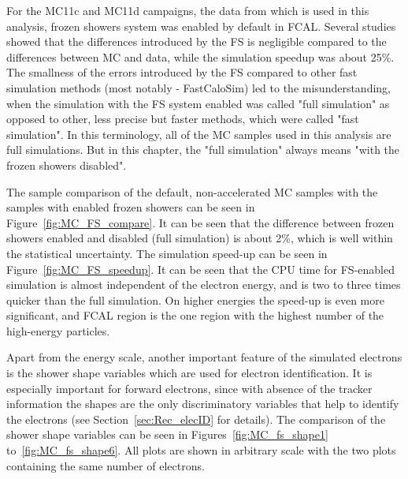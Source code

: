 For the MC11c and MC11d campaigns, the data from which is used in this analysis, frozen showers system was enabled by default in FCAL. Several studies showed that the differences introduced by the FS is negligible compared to the differences between MC and data, while the simulation speedup was about 25\%. The smallness of the errors introduced by the FS compared to other fast simulation methods (most notably - FastCaloSim) led to the misunderstanding, when the simulation with the FS system enabled was called "full simulation" as opposed to other, less precise but faster methods, which were called "fast simulation". In this terminology, all of the MC samples used in this analysis are full simulations. But in this chapter, the "full simulation" always means "with the frozen showers disabled".

The sample comparison of the default, non-accelerated MC samples with the samples with enabled frozen showers can be seen in Figure~\ref{fig:MC_FS_compare}. It can be seen that the difference between frozen showers enabled and disabled (full simulation) is about 2\%, which is well within the statistical uncertainty. The simulation speed-up can be seen in Figure~\ref{fig:MC_FS_speedup}. It can be seen that the CPU time for FS-enabled simulation is almost independent of the electron energy, and is two to three times quicker than the full simulation. On higher energies the speed-up is even more significant, and FCAL region is the one region with the highest number of the high-energy particles.

Apart from the energy scale, another important feature of the simulated electrons is the shower shape variables which are used for electron identification. It is especially important for forward electrons, since with absence of the tracker information the shapes are the only discriminatory variables that help to identify the electrons (see Section~\ref{sec:Rec_elecID} for details). The comparison of the shower shape variables can be seen in Figures~\ref{fig:MC_fs_shape1} to~\ref{fig:MC_fs_shape6}. All plots are shown in arbitrary scale with the two plots containing the same number of electrons.

\begin{figure}
\end{figure}

